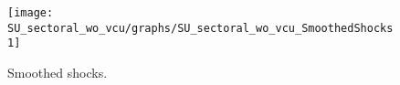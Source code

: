  
\begin{figure}[H]
\centering 
\texttt{[image: SU\_sectoral\_wo\_vcu/graphs/SU\_sectoral\_wo\_vcu\_SmoothedShocks1]}
\caption{Smoothed shocks.}\label{Fig:SmoothedShocks:1}
\end{figure}


